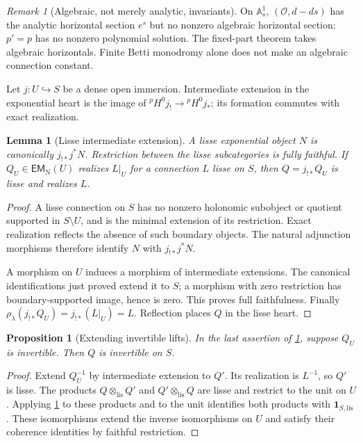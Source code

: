 \documentclass[11pt]{article}
\numberwithin{equation}{section}
\newtheorem{lemma}[lemma]{Lemma}
\newtheorem{proposition}[proposition]{Proposition}
\theoremstyle{definition}
\theoremstyle{remark}
\newtheorem{remark}[remark]{Remark}
\newcommand{\A}{\mathbb A}
\newcommand{\Ocal}{\mathcal O}
\newcommand{\EM}{\mathsf{EM}_{\mathrm N}}
\newcommand{\lis}{\mathrm{lis}}
\newcommand{\pH}{{}^{p}\!H}
\newcommand{\one}{\mathbf1}
\begin{document}
\begin{remark}[Algebraic, not merely analytic, invariants]
On $\A^1_s$, $(\Ocal,d-ds)$ has the analytic horizontal section $e^s$
but no nonzero algebraic horizontal section: $p'=p$ has no nonzero
polynomial solution. The fixed-part theorem takes algebraic horizontals.
Finite Betti monodromy alone does not make an algebraic connection constant.
\end{remark}

Let $j:U\hookrightarrow S$ be a dense open immersion. Intermediate
extension in the exponential heart is the image of
$\pH^0j_!\to\pH^0j_*$; its formation commutes with exact realization.

\begin{lemma}[Lisse intermediate extension]\label{lem:middle}
A lisse exponential object $N$ is canonically $j_{!*}j^*N$. Restriction
between the lisse subcategories is fully faithful. If $Q_U\in\EM(U)$
realizes $L|_U$ for a connection $L$ lisse on $S$, then
$Q=j_{!*}Q_U$ is lisse and realizes $L$.
\end{lemma}
\begin{proof}
A lisse connection on $S$ has no nonzero holonomic subobject or quotient
supported in $S\setminus U$, and is the minimal extension of its
restriction. Exact realization reflects the absence of such boundary
objects. The natural adjunction morphisms therefore identify $N$ with
$j_{!*}j^*N$.

A morphism on $U$ induces a morphism of intermediate extensions. The
canonical identifications just proved extend it to $S$; a morphism with
zero restriction has boundary-supported image, hence is zero. This proves
full faithfulness. Finally
$\rho_\lambda(j_{!*}Q_U)=j_{!*}(L|_U)=L$. Reflection places $Q$ in the
lisse heart.
\end{proof}

\begin{proposition}[Extending invertible lifts]\label{prop:extend-line}
In the last assertion of \cref{lem:middle}, suppose $Q_U$ is invertible.
Then $Q$ is invertible on $S$.
\end{proposition}
\begin{proof}
Extend $Q_U^{-1}$ by intermediate extension to $Q'$. Its realization is
$L^{-1}$, so $Q'$ is lisse. The products $Q\otimes_{\lis}Q'$ and
$Q'\otimes_{\lis}Q$ are lisse and restrict to the unit on $U$. Applying
\cref{lem:middle} to these products and to the unit identifies both
products with $\one_{S,\lis}$. These isomorphisms extend the inverse
isomorphisms on $U$ and satisfy their coherence identities by faithful
restriction.
\end{proof}
\end{document}

